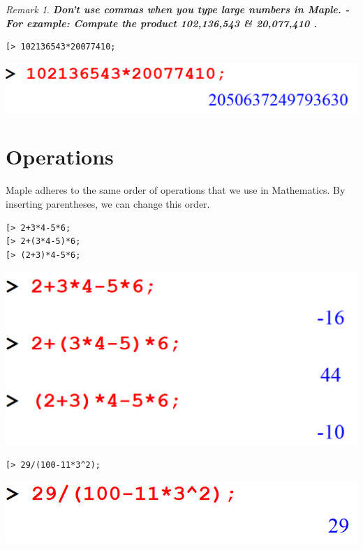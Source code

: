 \documentclass[
]{book}
\theoremstyle{definition}
\theoremstyle{definition}
\theoremstyle{definition}
\theoremstyle{definition}
\theoremstyle{remark}
\newtheorem*{remark}{Remark}
\begin{document}
\begin{remark}
\textbf{\emph{Don't use commas when you type large numbers in Maple.
- For example: Compute the product 102,136,543 \& 20,077,410 .}}
\end{remark}

\begin{verbatim}
[> 102136543*20077410;
\end{verbatim}

\includegraphics{figures/Lesson 1/fig13.png}

\section{Operations}\label{operations}

Maple adheres to the same order of operations that we use in Mathematics. By inserting parentheses, we can change this order.

\begin{verbatim}
[> 2+3*4-5*6;
[> 2+(3*4-5)*6;
[> (2+3)*4-5*6;
\end{verbatim}

\includegraphics{figures/Lesson 1/fig14.png}

\begin{verbatim}
[> 29/(100-11*3^2);
\end{verbatim}

\includegraphics{figures/Lesson 1/fig15.png}
\end{document}
